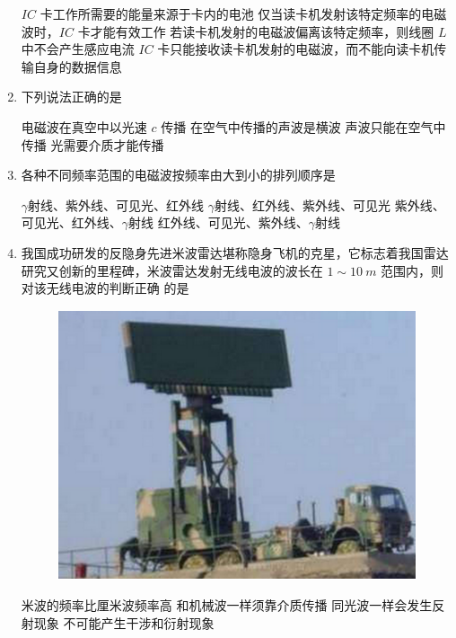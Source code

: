 \begin{enumerate}
\fourchoices
{$ IC $ 卡工作所需要的能量来源于卡内的电池}
{仅当读卡机发射该特定频率的电磁波时，$ IC $ 卡才能有效工作}
{若读卡机发射的电磁波偏离该特定频率，则线圈 $ L $ 中不会产生感应电流}
{$ IC $ 卡只能接收读卡机发射的电磁波，而不能向读卡机传输自身的数据信息}



\item 
{}
下列说法正确的是  

\fourchoices
{电磁波在真空中以光速 $ c $ 传播}
{在空气中传播的声波是横波}
{声波只能在空气中传播}
{光需要介质才能传播}



\item 
{}
各种不同频率范围的电磁波按频率由大到小的排列顺序是  

\fourchoices
{$ \gamma $射线、紫外线、可见光、红外线}
{$ \gamma $射线、红外线、紫外线、可见光}
{紫外线、可见光、红外线、$ \gamma $射线}
{红外线、可见光、紫外线、$ \gamma $射线}



\item 
{}
我国成功研发的反隐身先进米波雷达堪称隐身飞机的克星，它标志着我国雷达
研究又创新的里程碑，米波雷达发射无线电波的波长在 $ 1 \sim 10 \ m $ 范围内，则对该无线电波的判断正确
的是  
\begin{figure}[h!]
	\centering
	\includegraphics[width=0.17\linewidth]{picture/screenshot072}
\end{figure}

\fourchoices
{米波的频率比厘米波频率高}
{和机械波一样须靠介质传播}
{同光波一样会发生反射现象}
{不可能产生干涉和衍射现象}






	
	
	
\end{enumerate}

